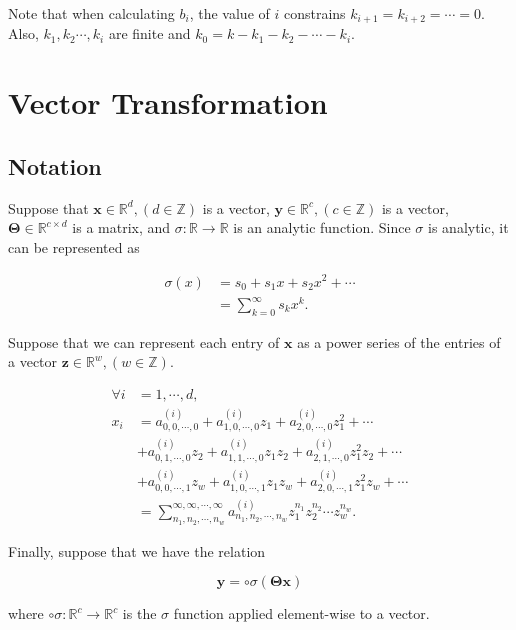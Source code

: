 Note that when calculating $b_i$, the value of $i$ constrains $k_{i+1} = k_{i+2} = \cdots = 0$. Also, $k_1, k_2 \cdots, k_i$ are finite and $k_0 = k - k_1 - k_2 - \cdots - k_i$.

\section{Vector Transformation}
\subsection{Notation}

Suppose that $\mathbf{x} \in \mathbb{R}^d, (d \in \mathbb{Z})$ is a vector, $\mathbf{y} \in \mathbb{R}^c, (c \in \mathbb{Z})$ is a vector, $\mathbf{\Theta} \in \mathbb{R}^{c \times d}$ is a matrix, and $\sigma: \mathbb{R} \to \mathbb{R}$ is an analytic function. Since $\sigma$ is analytic, it can be represented as

\begin{align*}
    \sigma(x)
    &= s_0 + s_1 x + s_2 x^2 + \cdots \\
    &= \sum_{k=0}^{\infty} s_{k} x^{k}.
\end{align*}

Suppose that we can represent each entry of $\mathbf{x}$ as a power series of the entries of a vector $\mathbf{z} \in \mathbb{R}^{w}, (w \in \mathbb{Z})$.

\begin{align*}
    \forall i &= 1, \cdots, d, \\ x_i
    &= a^{(i)}_{0,0,\cdots,0} + a^{(i)}_{1,0,\cdots,0} z_1 + a^{(i)}_{2,0,\cdots,0} z_1^2 + \cdots \\
    &+ a^{(i)}_{0,1,\cdots,0} z_2 + a^{(i)}_{1,1,\cdots,0} z_1 z_2 + a^{(i)}_{2,1,\cdots,0} z_1^2 z_2 + \cdots \\
    &+ a^{(i)}_{0,0,\cdots,1} z_w + a^{(i)}_{1,0,\cdots,1} z_1 z_w + a^{(i)}_{2,0,\cdots,1} z_1^2 z_w + \cdots \\
    &= \sum_{n_1,n_2,\cdots,n_w}^{\infty,\infty,\cdots,\infty} a^{(i)}_{n_1,n_2,\cdots,n_w} z_1^{n_1} z_2^{n_2} \cdots z_w^{n_w}.
\end{align*}

Finally, suppose that we have the relation

\begin{equation*}
    \mathbf{y} = \circ\sigma(\mathbf{\Theta} \mathbf{x})
\end{equation*}

where $\circ\sigma: \mathbb{R}^{c} \to \mathbb{R}^{c}$ is the $\sigma$ function applied element-wise to a vector.

